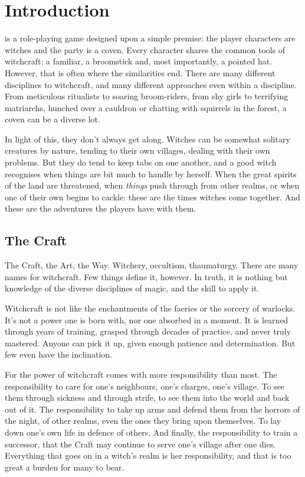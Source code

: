 \chapter{Introduction}

 is a role-playing game designed upon a simple premise: the player characters are witches and the party is a coven.
Every character shares the common tools of witchcraft: a familiar, a broomstick and, most importantly, a pointed hat.
However, that is often where the similarities end.
There are many different disciplines to witchcraft, and many different approaches even within a discipline.
From meticulous ritualists to soaring broom-riders, from shy girls to terrifying matriarchs, hunched over a cauldron or chatting with squirrels in the forest, a coven can be a diverse lot.

In light of this, they don't always get along.
Witches can be somewhat solitary creatures by nature, tending to their own villages, dealing with their own problems.
But they do tend to keep tabs on one another, and a good witch recognises when things are bit much to handle by herself.
When the great spirits of the land are threatened, when \emph{things} push through from other realms, or when one of their own begins to cackle: these are the times witches come together.
And these are the adventures the players have with them.

\section{The Craft}

The Craft, the Art, the Way.
Witchery, occultism, thaumaturgy.
There are many names for witchcraft.
Few things define it, however.
In truth, it is nothing but knowledge of the diverse disciplines of magic, and the skill to apply it.

Witchcraft is not like the enchantments of the faeries or the sorcery of warlocks.
It's not a power one is born with, nor one absorbed in a moment.
It is learned through years of training, grasped through decades of practice, and never truly mastered.
Anyone can pick it up, given enough patience and determination.
But few even have the inclination.

For the power of witchcraft comes with more responsibility than most.
The responsibility to care for one's neighbours, one's charges, one's village.
To see them through sickness and through strife, to see them into the world and back out of it.
The responsibility to take up arms and defend them from the horrors of the night, of other realms, even the ones they bring upon themselves.
To lay down one's own life in defence of others.
And finally, the responsibility to train a successor, that the Craft may continue to serve one's village after one dies.
Everything that goes on in a witch's realm is her responsibility, and that is too great a burden for many to bear.

